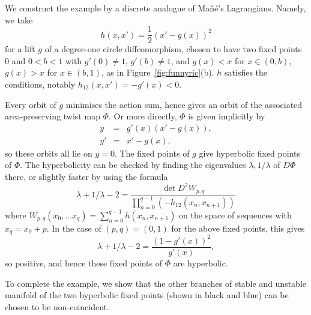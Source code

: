 \documentclass[12pt]{article}
\newcounter{number}
\newcommand{\RSM}{\textcolor{red}}
\begin{document}
We construct the example by a discrete analogue of Ma\~n\'e's Lagrangians.  Namely, we take $$h(x,x')= \frac12(x'-g(x))^2$$ for a lift $g$ of a degree-one circle diffeomorphism, chosen to have two fixed points $0$ and $0<b<1$ with $g'(0)\ne 1$, $g'(b)\ne 1$, and $g(x)<x$ for $x \in (0,b)$, $g(x)>x$ for $x \in (b,1)$, as in Figure~\ref{fig:funnyric}(b).  $h$ satisfies the conditions, notably $h_{12}(x,x') = -g'(x)<0$.

Every orbit of $g$ minimises the action sum, hence gives an orbit of the associated area-preserving twist map $\Phi$.  Or more directly, $\Phi$ is given implicitly by
\begin{eqnarray}
y &=& g'(x)(x'-g(x)), \nonumber \\
y' &=& x'-g(x), \nonumber
\end{eqnarray}
so these orbits all lie on $y=0$.
The fixed points of $g$ give hyperbolic fixed points of $\Phi$.  The hyperbolicity can be checked by finding the eigenvalues $\lambda,1/\lambda$ of $D\Phi$ there, or slightly faster by using the formula \cite{MM}
$$\lambda+1/\lambda-2 = \frac{\det D^2W_{p,q}}{\prod_{n=0}^{q-1} (-h_{12}(x_n,x_{n+1}))}$$
where $W_{p,q}(x_0,\ldots x_q) = \sum_{n=0}^{q-1} h(x_n,x_{n+1})$ on the space of sequences with $x_q=x_0+p$.  In the case of $(p,q)=(0,1)$ for the above fixed points, this gives $$\lambda+1/\lambda-2 = \frac{(1-g'(x))^2}{g'(x)},$$
so positive, and hence these fixed points of $\Phi$ are hyperbolic.

To complete the example, we show that the other branches of stable and unstable manifold of the two hyperbolic fixed points (shown in black and blue) can be chosen to be non-coincident.  %

\end{document}
